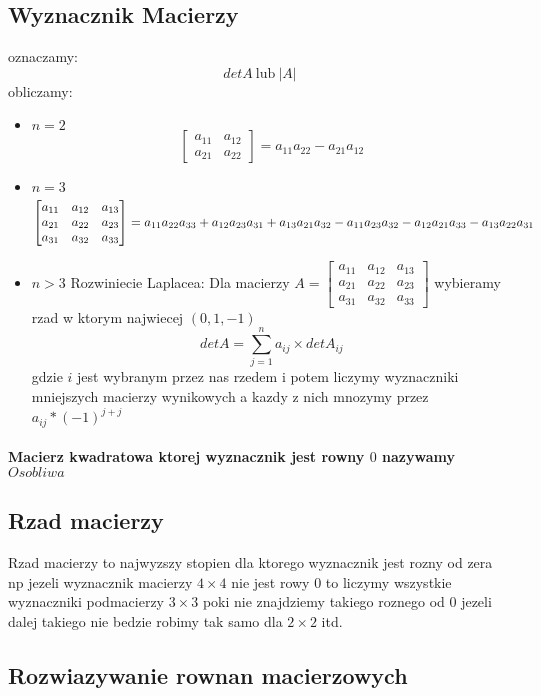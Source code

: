 \documentclass[a4paper]{article}
\begin{document}
\subsection{Wyznacznik Macierzy}
oznaczamy:
\begin{equation}
    det A \ \text{lub} \ |A|
\end{equation}
obliczamy:
\begin{itemize}
    \item $n = 2$
    \begin{equation}
    \begin{bmatrix}
        a_{11} & a_{12} \\
        a_{21} & a_{22}
    \end{bmatrix} = a_{11}a_{22} - a_{21}a_{12}
    \end{equation}
    \item $n = 3$
    \begin{equation}
        \begin{bmatrix}
            a_{11} & a_{12} & a_{13}\\
            a_{21} & a_{22} & a_{23} \\
            a_{31} & a_{32} & a_{33}
        \end{bmatrix} = a_{11}a_{22}a_{33} + a_{12}a_{23}a_{31} + \\ a_{13}a_{21}a_{32} - a_{11}a_{23}a_{32} - a_{12}a_{21}a_{33} - a_{13}a_{22}a_{31}
    \end{equation}
    \item $n>3$ Rozwiniecie Laplacea:
    Dla macierzy
    $A =
    \begin{bmatrix}
            a_{11} & a_{12} & a_{13}\\
            a_{21} & a_{22} & a_{23} \\
            a_{31} & a_{32} & a_{33}
    \end{bmatrix} $
    wybieramy rzad w ktorym najwiecej $(0,1,-1)$
    \begin{equation}
        det A = \sum^{n}_{j=1}a_{ij}\times detA_{ij}
    \end{equation}
    gdzie $i$ jest wybranym przez nas rzedem i potem liczymy wyznaczniki mniejszych macierzy wynikowych a kazdy z nich mnozymy przez $ a_{ij} * (-1)^{j+j} $
\end{itemize}
\paragraph{ Macierz kwadratowa ktorej wyznacznik jest rowny $ 0 $ nazywamy $Osobliwa$
}\subsection{Rzad macierzy}
Rzad macierzy to najwyzszy stopien dla ktorego wyznacznik jest rozny od zera \\
np jezeli wyznacznik macierzy $4 \times 4$ nie jest rowy $0$ to liczymy wszystkie wyznaczniki podmacierzy $3 \times 3$ poki nie znajdziemy takiego roznego od $0$ jezeli dalej takiego nie bedzie robimy tak samo dla $2 \times 2$ itd.
\subsection{Rozwiazywanie rownan macierzowych}
\end{document}
